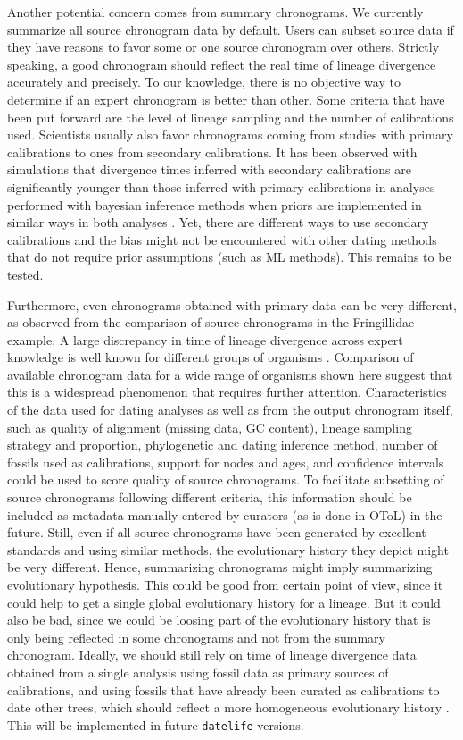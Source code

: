 \documentclass[11pt,]{article}
\begin{document}
Another potential concern comes from summary chronograms. We currently
summarize all source chronogram data by default. Users can subset source
data if they have reasons to favor some or one source chronogram over
others. Strictly speaking, a good chronogram should reflect the real
time of lineage divergence accurately and precisely. To our knowledge,
there is no objective way to determine if an expert chronogram is better
than other. Some criteria that have been put forward are the level of
lineage sampling and the number of calibrations used. Scientists usually
also favor chronograms coming from studies with primary calibrations to
ones from secondary calibrations. It has been observed with simulations
that divergence times inferred with secondary calibrations are
significantly younger than those inferred with primary calibrations in
analyses performed with bayesian inference methods when priors are
implemented in similar ways in both analyses \citep{schenk2016sec}. Yet,
there are different ways to use secondary calibrations and the bias
might not be encountered with other dating methods that do not require
prior assumptions (such as ML methods). This remains to be tested.

Furthermore, even chronograms obtained with primary data can be very
different, as observed from the comparison of source chronograms in the
Fringillidae example. A large discrepancy in time of lineage divergence
across expert knowledge is well known for different groups of organisms
\citep[e.g., angiosperms;][]{magallon2015metacalibrated}. Comparison of
available chronogram data for a wide range of organisms shown here
suggest that this is a widespread phenomenon that requires further
attention. Characteristics of the data used for dating analyses as well
as from the output chronogram itself, such as quality of alignment
(missing data, GC content), lineage sampling strategy and proportion,
phylogenetic and dating inference method, number of fossils used as
calibrations, support for nodes and ages, and confidence intervals could
be used to score quality of source chronograms. To facilitate subsetting
of source chronograms following different criteria, this information
should be included as metadata manually entered by curators (as is done
in OToL) in the future. Still, even if all source chronograms have been
generated by excellent standards and using similar methods, the
evolutionary history they depict might be very different. Hence,
summarizing chronograms might imply summarizing evolutionary hypothesis.
This could be good from certain point of view, since it could help to
get a single global evolutionary history for a lineage. But it could
also be bad, since we could be loosing part of the evolutionary history
that is only being reflected in some chronograms and not from the
summary chronogram. Ideally, we should still rely on time of lineage
divergence data obtained from a single analysis using fossil data as
primary sources of calibrations, and using fossils that have already
been curated as calibrations to date other trees, which should reflect a
more homogeneous evolutionary history \citep{antonelli2017supersmart}.
This will be implemented in future \texttt{datelife} versions.
\end{document}

